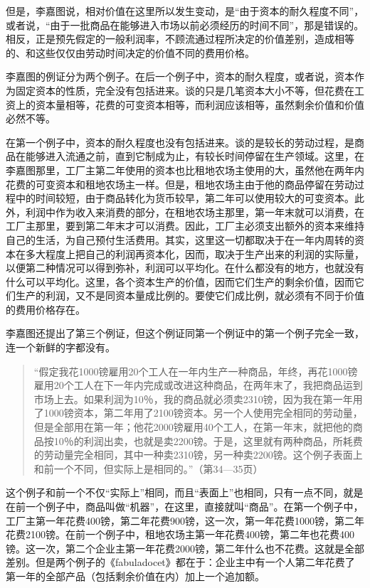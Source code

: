 但是，李嘉图说，相对价值在这里所以发生变动，是“由于资本的耐久程度不同”，或者说，“由于一批商品在能够进入市场以前必须经历的时间不同”，那是错误的。相反，正是预先假定的一般利润率，不顾流通过程所决定的价值差别，造成相等的、和这些仅仅由劳动时间决定的价值不同的费用价格。

李嘉图的例证分为两个例子。在后一个例子中，资本的耐久程度，或者说，资本作为固定资本的性质，完全没有包括进来。谈的只是几笔资本大小不等，但花费在工资上的资本量相等，花费的可变资本相等，而利润应该相等，虽然剩余价值和价值必然不等。

在第一个例子中，资本的耐久程度也没有包括进来。谈的是较长的劳动过程，是商品在能够进入流通之前，直到它制成为止，有较长时间停留在生产领域。这里，在李嘉图那里，工厂主第二年使用的资本也比租地农场主使用的大，虽然他在两年内花费的可变资本和租地农场主一样。但是，租地农场主由于他的商品停留在劳动过程中的时间较短，由于商品转化为货币较早，第二年可以使用较大的可变资本。此外，利润中作为收入来消费的部分，在租地农场主那里，第一年末就可以消费，在工厂主那里，要到第二年末才可以消费。因此，工厂主必须支出额外的资本来维持自己的生活，为自己预付生活费用。其实，这里这一切都取决于在一年内周转的资本在多大程度上把自己的利润再资本化，因而，取决于生产出来的利润的实际量，以便第二种情况可以得到弥补，利润可以平均化。在什么都没有的地方，也就没有什么可以平均化。这里，各个资本生产的价值，因而它们生产的剩余价值，因而它们生产的利润，又不是同资本量成比例的。要使它们成比例，就必须有不同于价值的费用价格存在。

李嘉图还提出了第三个例证，但这个例证同第一个例证中的第一个例子完全一致，连一个新鲜的字都没有。

\begin{quote}{“假定我花1000镑雇用20个工人在一年内生产一种商品，年终，再花1000镑雇用20个工人在下一年内完成或改进这种商品，在两年末了，我把商品运到市场上去。如果利润为10％，我的商品就必须卖2310镑，因为我在第一年用了1000镑资本，第二年用了2100镑资本。另一个人使用完全相同的劳动量，但是全部用在第一年；他花2000镑雇用40个工人，在第一年末，就把他的商品按10％的利润出卖，也就是卖2200镑。于是，这里就有两种商品，所耗费的劳动量完全相同，其中一种卖2310镑，另一种卖2200镑。这个例子表面上和前一个不同，但实际上是相同的。”（第34—35页）}\end{quote}

这个例子和前一个不仅“实际上”相同，而且“表面上”也相同，只有一点不同，就是在前一个例子中，商品叫做“机器”，在这里，直接就叫“商品”。在第一个例子中，工厂主第一年花费400镑，第二年花费900镑，这一次，第一年花费1000镑，第二年花费2100镑。在前一个例子中，租地农场主第一年花费400镑，第二年也花费400镑。这一次，第二个企业主第一年花费2000镑，第二年什么也不花费。这就是全部差别。但是两个例子的《fabuladocet》都在于：企业主中有一个人第二年花费了第一年的全部产品（包括剩余价值在内）加上一个追加额。

